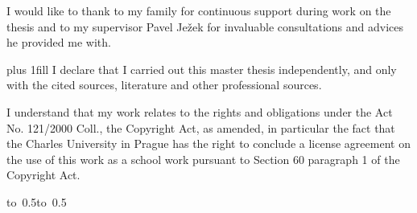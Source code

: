 \documentclass[12pt,a4paper]{report}
\begin{document}
\newpage
\noindent 
I would like to thank to my family for continuous support during work on the thesis and to my supervisor Pavel Ježek for invaluable consultations and advices he provided me with.



\newpage

\vglue 0pt plus 1fill
\noindent
I declare that I carried out this master thesis independently, and only with the cited sources, literature and other professional sources.

\medskip\noindent
I understand that my work relates to the rights and obligations under the Act No. 121/2000 Coll., the Copyright Act, as amended, in particular the fact that the Charles University in Prague has the right to conclude a license agreement on the use of this work as a school work pursuant to Section 60 paragraph 1 of the Copyright Act.

\vspace{10mm}
\hbox{\hbox to 0.5\hbox to 0.5}
\vspace{20mm}



\newpage
\end{document}
